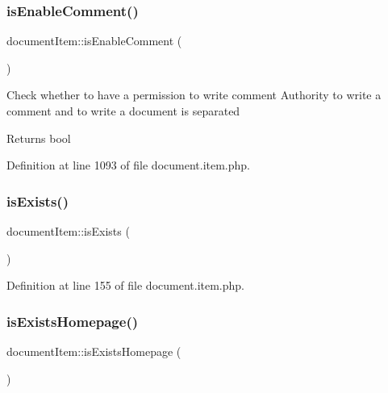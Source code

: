 \hypertarget{classdocumentItem_aff71a0f39ddc720c21c5cf39805b31a8}{}\label{classdocumentItem_aff71a0f39ddc720c21c5cf39805b31a8} 
\subsubsection{\texorpdfstring{is\+Enable\+Comment()}{isEnableComment()}}
{\footnotesize\ttfamily document\+Item\+::is\+Enable\+Comment (\begin{DoxyParamCaption}{ }\end{DoxyParamCaption})}

Check whether to have a permission to write comment Authority to write a comment and to write a document is separated \begin{DoxyReturn}{Returns}
bool 
\end{DoxyReturn}


Definition at line 1093 of file document.\+item.\+php.

\hypertarget{classdocumentItem_a91139891022f05e19b2f685ed25e000b}{}\label{classdocumentItem_a91139891022f05e19b2f685ed25e000b} 
\subsubsection{\texorpdfstring{is\+Exists()}{isExists()}}
{\footnotesize\ttfamily document\+Item\+::is\+Exists (\begin{DoxyParamCaption}{ }\end{DoxyParamCaption})}



Definition at line 155 of file document.\+item.\+php.

\hypertarget{classdocumentItem_a7cc882ce0da6cbe675be8fdb980a0d97}{}\label{classdocumentItem_a7cc882ce0da6cbe675be8fdb980a0d97} 
\subsubsection{\texorpdfstring{is\+Exists\+Homepage()}{isExistsHomepage()}}
{\footnotesize\ttfamily document\+Item\+::is\+Exists\+Homepage (\begin{DoxyParamCaption}{ }\end{DoxyParamCaption})}



